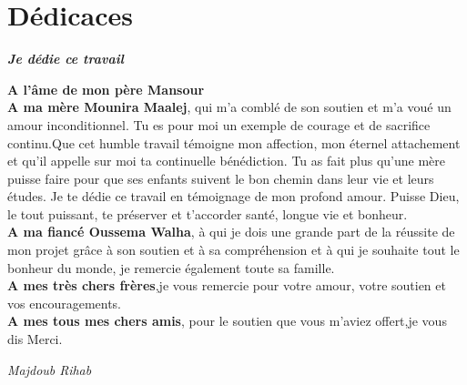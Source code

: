 \section*{Dédicaces}
\vspace{1.0in}
\begin{center}
\textit{\textbf{ Je dédie ce travail} }
\end{center}
\begin{center}
 \textbf{A l'âme de mon père Mansour}
 \\[0.2in]
 \textbf{A ma mère Mounira Maalej}, qui m'a comblé de son soutien et m'a 
voué un amour inconditionnel. Tu es pour moi un exemple de
courage et de sacrifice continu.Que cet humble travail témoigne
mon affection, mon éternel attachement et qu'il appelle sur moi
ta continuelle bénédiction. Tu as fait plus qu’une mère puisse faire pour que ses 
enfants suivent le bon chemin dans leur vie et leurs études. 
Je te dédie ce travail en témoignage de mon profond 
amour. Puisse Dieu, le tout puissant, te préserver et 
t’accorder santé, longue vie et bonheur.
\\[0.2in]
\textbf{A ma fiancé Oussema Walha},
à qui je dois une grande part de la réussite de mon projet grâce à
son soutien et à sa compréhension et à qui je souhaite tout le bonheur du monde,
je remercie également toute sa famille.
\\[0.2in]
\textbf{A mes très chers frères},je vous remercie pour votre amour, 
votre soutien et vos encouragements. 
\\[0.2in]
\textbf{A mes tous mes chers amis}, pour le soutien que vous m'aviez
offert,je vous dis Merci.
\begin{flushright}
 \textit{Majdoub Rihab}
\end{flushright}

\end{center}


